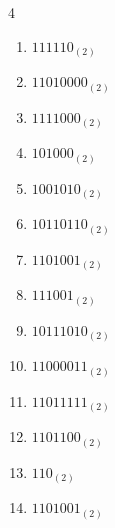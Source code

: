 


\setcounter{quesnum}{60}

\begin{multicols}{4}
\begin{enumerate}
  \itemsep=10pt
  \item $111110_{(2)}$

        \phantom{$=62$}

  \item $11010000_{(2)}$

        \phantom{$=208$}

  \item $1111000_{(2)}$

        \phantom{$=120$}

  \item $101000_{(2)}$

        \phantom{$=40$}

  \item $1001010_{(2)}$

        \phantom{$=74$}

  \item $10110110_{(2)}$

        \phantom{$=182$}

  \item $1101001_{(2)}$

        \phantom{$=105$}

  \item $111001_{(2)}$

        \phantom{$=57$}

  \item $10111010_{(2)}$

        \phantom{$=186$}

  \item $11000011_{(2)}$

        \phantom{$=195$}

  \item $11011111_{(2)}$

        \phantom{$=223$}

  \item $1101100_{(2)}$

        \phantom{$=108$}

  \item $110_{(2)}$

        \phantom{$=6$}

  \item $1101001_{(2)}$


\end{enumerate}
\end{multicols}
